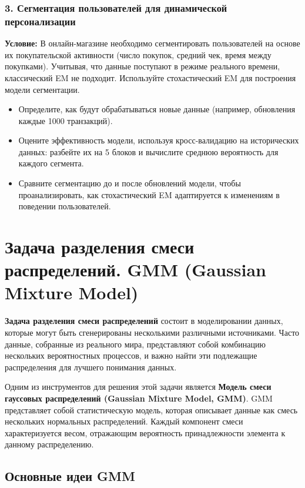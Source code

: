 \subsubsection*{3. Сегментация пользователей для динамической персонализации}
\textbf{Условие:} В онлайн-магазине необходимо сегментировать пользователей на основе их покупательской активности (число покупок, средний чек, время между покупками). Учитывая, что данные поступают в режиме реального времени, классический EM не подходит. Используйте стохастический EM для построения модели сегментации.
\begin{itemize}
    \item Определите, как будут обрабатываться новые данные (например, обновления каждые 1000 транзакций).
    \item Оцените эффективность модели, используя кросс-валидацию на исторических данных: разбейте их на 5 блоков и вычислите среднюю вероятность для каждого сегмента.
    \item Сравните сегментацию до и после обновлений модели, чтобы проанализировать, как стохастический EM адаптируется к изменениям в поведении пользователей.
\end{itemize}


\section{Задача разделения смеси распределений. GMM (Gaussian Mixture Model)}

\textbf{Задача разделения смеси распределений} состоит в моделировании данных, которые могут быть сгенерированы несколькими различными источниками. Часто данные, собранные из реального мира, представляют собой комбинацию нескольких вероятностных процессов, и важно найти эти подлежащие распределения для лучшего понимания данных.

Одним из инструментов для решения этой задачи является \textbf{Модель смеси гауссовых распределений (Gaussian Mixture Model, GMM)}. GMM представляет собой статистическую модель, которая описывает данные как смесь нескольких нормальных распределений. Каждый компонент смеси характеризуется весом, отражающим вероятность принадлежности элемента к данному распределению.

\subsection{Основные идеи  GMM}

